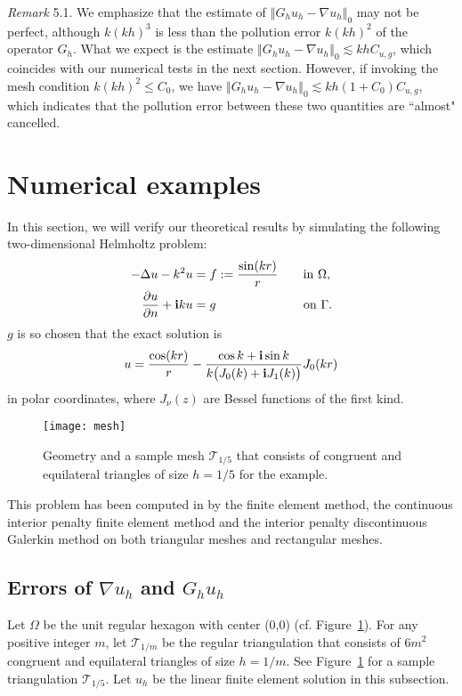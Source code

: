 \documentclass[leqno,final]{siamltex}
\numberwithin{equation}{section}
\newcommand{\norm}[1]{\left\Vert#1\right\Vert}
\newcommand{\ls}{\lesssim}
\newcommand{\De}{\Delta}
\newcommand{\Ga}{\Gamma}
\newcommand{\na}{\nabla}
\newcommand{\Om}{\Omega}
\newcommand{\pa}{\partial}
\renewcommand{\i}{{\rm\mathbf i}}
\newcommand{\T}{\mathcal{T}}
\newcommand{\eq}[1]{\begin{align}#1\end{align}}
\begin{document}
\emph{Remark} 5.1. We emphasize that the estimate of $\norm{G_hu_h-\na u_h}_0$ may not be perfect, although
$k(kh)^3$ is less than the pollution error $k(kh)^2$ of the operator $G_h$. What we expect is the estimate
$\norm{G_hu_h-\na u_h}_0\ls khC_{u,g}$, which coincides with our numerical tests in the next section.
However, if invoking the mesh condition $k(kh)^2\leq C_0$, we have $\norm{G_hu_h-\na u_h}_0\ls kh(1+C_0)C_{u,g}$, which indicates that the pollution error between these two quantities are ``almost" cancelled.

\section{Numerical examples} \label{num}
In this section, we will verify our theoretical results by simulating the following two-dimensional Helmholtz problem:
\eq{ -\De u - k^2 u &=f:=\frac{\sin(kr)}{r}  \qquad\mbox{in  } \Om, \label{num-eq-1}\\
\frac{\pa u}{\pa n} +\i k u& =g \quad\qquad\qquad\qquad\mbox{on } \Ga. \label{num-eq-2} }
$g$ is so chosen that the exact solution
is
\eq{ u=\frac{\cos(k r)}{r}-\frac{\cos k+\i\sin k}{k\big(J_0(k)+\i J_1(k)\big)}J_0(k r) }
in polar coordinates, where $J_\nu(z)$ are Bessel functions of the first kind.
\begin{figure}[htbp]
\begin{center}
\texttt{[image: mesh]}
\caption{Geometry and a sample mesh $\T_{1/5}$ that consists of congruent and equilateral triangles of size
$h=1/5$ for the example.}
\end{center}
\label{num-fig1}
\end{figure}

This problem has been computed in \cite{fw09,dw,zd,dzh} by the finite element method, the continuous interior penalty finite element
method and the interior penalty discontinuous Galerkin method on both triangular meshes and rectangular meshes.

\subsection{Errors of $\na u_h$ and $G_h u_h$ }
Let $\Om$ be the unit regular hexagon with center (0,0) (cf. Figure~\ref{num-fig1}).
For any positive integer $m$, let $\T_{1/m}$ be the regular triangulation that consists of $6m^2$ congruent and equilateral
triangles of size $h=1/m$. See Figure~\ref{num-fig1} for a sample triangulation $\T_{1/5}$. Let $u_h$ be the linear finite element solution in this subsection.
\end{document}
